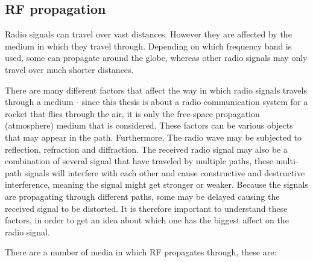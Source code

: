 \subsection{RF propagation}
Radio signals can travel over vast distances. However they are affected by the medium in which they travel through. Depending on which frequency band is used\cite{FrequencyBand}, some can propagate around the globe, whereas other radio signals may only travel over much shorter distances.

There are many different factors that affect the way in which radio signals travels through a medium - since this thesis is about a radio communication system for a rocket that flies through the air, it is only the free-space propagation (atmosphere) medium that is considered. These factors can be various objects that may appear in the path. Furthermore, The radio wave may be subjected to reflection, refraction and diffraction. The received radio signal may also be a combination of several signal that have traveled by multiple paths, these multi-path signals will interfere with each other and cause constructive and destructive interference, meaning the signal might get stronger or weaker. Because the signals are propagating through different paths, some may be delayed causing the received signal to be distorted. It is therefore important to understand these factors, in order to get an idea about which one has the biggest affect on the radio signal. 

There are a number of media in which RF propagates through, these are: 

